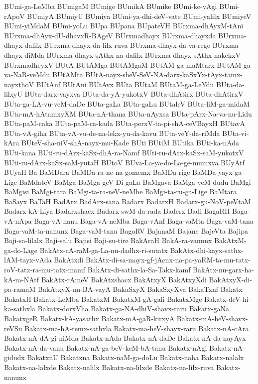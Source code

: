{BUmi-ga-LeMba
BUmigaM
BUmige
BUmikA
BUmike
BUmi-ke-yAgi
BUmi-rApoV
BUmiyA
BUmiyU
BUmiya
BUmi-ya-dhi-deV-vate
BUmi-yalilx
BUmiyeV
BUmi-yiMdaM
BUmi-yoLu
BUpa
BUpana
BUpateVH
BUrxma-dhAyxM-tAni
BUrxma-dhAyx-dU-dhavxR-BAgeV
BUrxmadhayx
BUrxma-dhayxda
BUrxma-dhayx-dalilx
BUrxma-dhayx-da-lilx-ruva
BUrxma-dhayx-da-va-rege
BUrxma-dhayx-diMda
BUrxma-dhayx-sAthx-na-dalilx
BUrxma-dhayx-sAthx-nakekxV
BUrxmadheyxV
BUtA
BUtAMga
BUtAMgaM
BUtAM-ga-maMtarx
BUtAM-ga-va-NaR-veMdu
BUtAMta
BUtA-nayx-sheV-SeV-NA-darx-kaSxYx-tAyx-tamx-nayxthoV
BUtAnf
BUtAni
BUtAvx
BUta
BUtaM
BUtaM-ga-LeYdu
BUta-da-lilxyU
BUta-darx-vayxva
BUta-da-yA-yukotxV
BUta-dhAtirx
BUta-dhAtirxV
BUta-ga-LA-vu-veM-daDe
BUta-gaLa
BUta-gaLu
BUtaleV
BUta-liM-ga-midaM
BUta-mA-hAtamxyXM
BUta-nA-thana
BUta-nAyxsa
BUta-pArx-Na-va-nu-Lidu
BUta-paM-caka
BUta-paM-ca-kada
BUta-perxV-ta-pi-shA-ceVBayxH
BUtavA
BUta-vA-giha
BUta-vA-vu-de-na-lekx-yu-da-kavu
BUta-veY-da-riMda
BUta-vi-kAra
BUteV-sha-niV-shA-nayx-mu-Kade
BUti
BUtiM
BUtika
BUti-ka-nAda
BUti-kana
BUti-ru-dArx-kaSx-dhA-ra-Namf
BUti-ru-dArx-kaSx-saM-yukotxV
BUti-ru-dArx-kaSx-saM-yutaH
BUtoV
BUva-La-ya-do-La-ge-mumxva
BUyAtf
BUyaH
Ba
BaMDara
BaMDa-ra-ne-na-gomemx
BaMDa-rige
BaMDa-yayx-ga-Lige
BaMdateV
BaMga
BaMga-geV-Di-gaLa
BaMgava
BaMga-veM-dudu
BaMgi
BaMgisi
BaMgi-tara
BaMgi-ta-ra-neV-neMbe
BaMgi-ta-ru-ga-Lige
BaMtara
BaSayx
BaTaH
BadArx
BadArx-sana
Badarx
BadarxH
Badarx-gu-NoV-peVtaM
Badarx-kA-Liya
Badarxshacx
Badarx-swM-da-rada
Baderx
Badi
BagaRH
Baga-vA-nApa
Baga-vA-nanu
Baga-vA-neMba
Baga-vAnf
Baga-vaMta
Baga-vaM-tana
Baga-vaM-ta-nanunx
Baga-vaM-tanu
BagoRV
BajanaM
Bajane
BajeVta
Bajipa
Baji-sa-lilalx
Baji-salu
Bajisi
Baji-su-tire
BakAraH
BakA-ra-vanunx
BakAtxM-ga-do-Lage
BakAtx-cA-raM-ga-La-nu-dadhx-ri-sutatx
BakAtx-dhi-kayx-sathx-lAM-tayx-vAda
BakAtxdi
BakAtx-di-sa-mayx-gf-jAcnx-na-pa-yaRM-ta-mu-tatx-roV-tatx-ra-mu-tatx-mamf
BakAtx-di-sathx-la-Sa-Takx-kamf
BakAtx-nu-garx-ha-kA-ra-NAtf
BakAtx-rAmeV
BakAtxshacx
BakAtxyX
BakAtxyXdi
BakAtxyX-di-pa-ramaM
BakAtxyX-nu-BA-vayA
BakaSxyX
BakaSxyXva
BakaTxnf
Bakatx
BakatxH
Bakatx-LeMba
BakatxM
BakatxM-gA-gali
BakatxMge
Bakatx-deV-hi-ka-sathxla
Bakatx-dorxVha
Bakatx-ga-NA-dhiV-shavx-raru
Bakatx-gaNa
BakatxgeR
Bakatx-kA-yasathx
Bakatx-mA-gaR-kirxyA
Bakatx-mA-heV-shavx-reVSu
Bakatx-ma-hA-temx-sathxla
Bakatx-ma-heV-shavx-raru
Bakatx-nA-cAra
Bakatx-nA-dA-gi-niMda
Bakatx-nAda
Bakatx-nA-daDe
Bakatx-nA-da-nayAyx
Bakatx-nA-da-vanu
Bakatx-nA-ga-beV-keM-bA-tanu
Bakatx-nAgi
Bakatx-nA-gidudx
BakatxnU
Bakatxna
Bakatx-naM-ga-doLu
Bakatx-naha
Bakatx-nalalx
Bakatx-na-lalxde
Bakatx-nalilx
Bakatx-na-lilxde
Bakatx-na-lilx-ruva
Bakatx-nanunx
}
